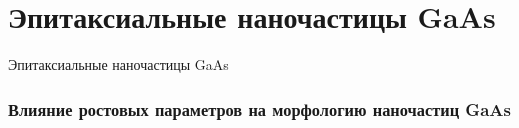 \section{Эпитаксиальные наночастицы GaAs}

\begin{frame}
	\begin{center}
		\Huge
		Эпитаксиальные наночастицы GaAs
	\end{center}
\end{frame}

\begin{frame}[c]
	\frametitle{Влияние ростовых параметров на морфологию наночастиц GaAs}
	\centering
	\begin{columns}[onlytextwidth]
		\begin{column}{0.48\textwidth}
			\centering
			\\[10pt]
			\begin{minipage}[t]{0.31\linewidth}
			\end{minipage}
			\begin{minipage}[t]{0.31\linewidth}
			\end{minipage}
			\begin{minipage}[t]{0.31\linewidth}
			\end{minipage}
		\end{column}
		\begin{column}{0.48\textwidth}
			\centering
			\\[10pt]
			\begin{minipage}[t]{0.31\linewidth}
			\end{minipage}
			\begin{minipage}[t]{0.31\linewidth}
			\end{minipage}
			\begin{minipage}[t]{0.31\linewidth}
			\end{minipage}
		\end{column}
	\end{columns}
\end{frame}

